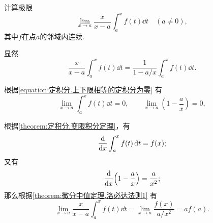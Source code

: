 \begin{example}
计算极限\begin{equation*}
	\lim_{x \to a} \frac{x}{x-a} \int_a^x f(t) \dd{t}
	\quad(a\neq0),
\end{equation*}
其中\(f\)在点\(a\)的邻域内连续.
\begin{solution}
显然\begin{equation*}
	\frac{x}{x-a} \int_a^x f(t) \dd{t}
	= \frac1{1 - a/x} \int_a^x f(t) \dd{t}.
\end{equation*}

根据\cref{equation:定积分.上下限相等的定积分为零} 有\begin{equation*}
	\lim_{x \to a} \int_a^x f(t) \dd{t} = 0, \qquad
	\lim_{x \to a} \left( 1 - \frac{a}{x} \right) = 0,
\end{equation*}

根据\cref{theorem:定积分.变限积分定理}，有\begin{equation*}
	\dv{x} \int_a^x f(t) \dd{t} = f(x);
\end{equation*}
又有\begin{equation*}
	\dv{x}(1 - \frac{a}{x}) = \frac{a}{x^2};
\end{equation*}
那么根据\cref{theorem:微分中值定理.洛必达法则1} 有\begin{equation*}
	\lim_{x \to a} \frac{x}{x-a} \int_a^x f(t) \dd{t}
	= \lim_{x \to a} \frac{f(x)}{a/x^2}
	= a f(a).
\end{equation*}
\end{solution}
\end{example}

